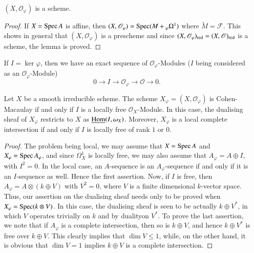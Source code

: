 \begin{lemma}\label{art05-lem3.1}
$(X,\mathscr{O}_{\varphi})$ is a scheme.
\end{lemma}

\begin{proof}
If $X=\operatorname{Spec} A$ is affine, then $(X,\mathscr{O}_{\varphi})\simeq \operatorname{Spec}
(M+{}_{\varphi}\Omega^{1})$ where $\widetilde{M}=\mathscr{F}$. This
shows in general that $(X,\mathscr{O}_{\varphi})$ is a prescheme and
since $(X,\mathscr{O}_{\varphi})_{\operatorname{red}}=(X,\mathscr{O})_{\operatorname{red}}$ is a
scheme, the lemma is proved.
\end{proof}

If $I=\ker \varphi$, then we have an exact sequence of
$\mathscr{O}_{\varphi}$-Modules ($I$ being considered as an
$\mathscr{O}_{\varphi}$-Module)
$$
0\to I\to \mathscr{O}_{\varphi}\to \mathscr{O}\to 0.
$$


\begin{lemma}\label{art05-lem3.2}
Let $X$ be a smooth irreducible scheme. The scheme
$X_{\varphi}=(X,\mathscr{O}_{\varphi})$ is Cohen-Macaulay if and only
if $I$ is a locally free $\mathscr{O}_{X}$-Module. In this case, the
dualising sheaf of $X_{\varphi}$ restricts to $X$ as
$\underline{\operatorname{Hom}}(I,\omega_{X})$. Moreover, $X_{\varphi}$ is a local
complete intersection if and only if $I$ is locally free of rank $1$
or $0$.
\end{lemma}

\begin{proof}
The problem being local, we may assume that $X=\operatorname{Spec} A$ and
$X_{\varphi}=\operatorname{Spec} A_{\varphi}$, and since $\Omega^{1}_{X}$ is locally
free, we may also assume that $A_{\varphi}=A\oplus I$, with
$I^{2}=0$. In the local case, an $A$-sequence is an
$A_{\varphi}$-sequence if and only if it is an $I$-sequence as
well. Hence the first assertion. Now, if $I$ is free, then
$A_{\varphi}=A\otimes (k\oplus V)$ with $V^{2}=0$, where $V$ is a
finite dimensional $k$-vector space. Thus, our assertion on the
dualising sheaf needs only to be proved when $X_{\varphi}=\operatorname{Spec}
(k\otimes V)$. In this case, the dualising sheaf is seen to be
actually $k\oplus V^{*}$, in which $V$ operates trivially on $k$ and
by duality\pageoriginale on $V^{*}$. To prove the last assertion, we
note that if $A_{\varphi}$ is a complete intersection, then so is
$k\oplus V$, and hence $k\oplus V^{*}$ is free over $k\oplus V$. This
clearly implies that $\dim V\leq 1$, while, on the other hand, it is
obvious that $\dim V=1$ implies $k\oplus V$ is a complete intersection. 
\end{proof}

